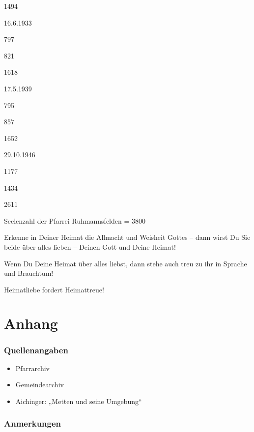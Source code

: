 \documentclass[12pt,a4pager]{book}
\begin{document}
1494

16.6.1933

797

821

1618

17.5.1939

795

857

1652

29.10.1946

1177

1434

2611


Seelenzahl der Pfarrei Ruhmannsfelden = 3800

Erkenne in Deiner Heimat die Allmacht und Weisheit Gottes – dann wirst Du Sie
beide über alles lieben – Deinen Gott und Deine Heimat!

Wenn Du Deine Heimat über alles liebst, dann stehe auch treu zu ihr in Sprache
und Brauchtum!

Heimatliebe fordert Heimattreue!

\part{Anhang}

\section{Quellenangaben}

\begin{itemize}
  \item Pfarrarchiv

  \item Gemeindearchiv

  \item Aichinger: „Metten und seine Umgebung“
\end{itemize}

\section{Anmerkungen}
\end{document}
